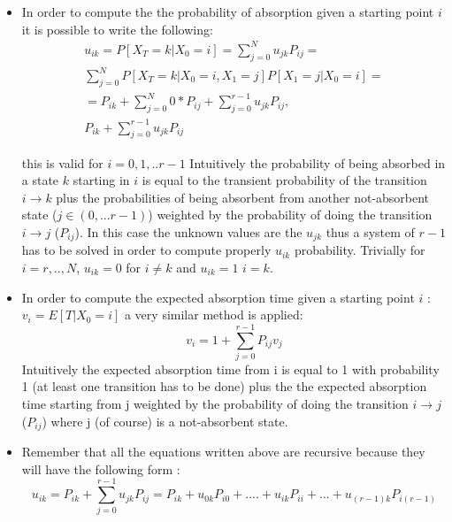 \begin{itemize}
\begin{itemize}
     \end{itemize} 
    \item In order to compute the the probability of absorption given a starting point $i$ it is possible to write the following:
    \begin{equation} 
    \begin{split}
      u_{ik} = P[X_T=k|X_0=i]= \sum\limits_{j=0}^N u_{jk}P_{ij}=\\
      \sum\limits_{j=0}^N P[X_T=k|X_0=i,X_1=j]P[X_1=j|X_0=i]=\\
      = P_{ik}+\sum\limits_{j=0}^N 0*P_{ij} +\sum\limits_{j=0}^{r-1} u_{jk}P_{ij},
      \\
      P_{ik}+\sum\limits_{j=0}^{r-1} u_{jk}P_{ij}              
      \end{split}      
     \end{equation}
     
       this is valid for $i= 0,1,..r-1$
    Intuitively the probability of being absorbed in a state $k$ starting in $i$ is equal to the transient probability of the transition $i\rightarrow k$ plus the probabilities of being absorbent from another not-absorbent state ($j \in (0,...r-1)$) weighted by the probability of doing the transition  $i\rightarrow j$ ($P_{ij}$). 
    In this case the unknown values are the $u_{jk}$ thus 
    a system of $ r-1$ has to be solved in order to compute properly $u_{ik}$ probability.
     \newline Trivially for $i= r,.. , N$, $u_{ik}=0$ for $i\neq k$ and $u_{ik}=1$ $i=k$.
 
 \item In order to compute the expected absorption time given a starting point $i$ : $v_i= E[T|X_0=i]$ a very similar method is applied: 
 \begin{equation}
 v_i= 1 + \sum\limits_{j=0}^{r-1} P_{ij} v_j
  \end{equation}
   Intuitively the expected absorption time from i is equal to 1 with probability 1 (at least one transition has to be done) plus the  the expected absorption time starting from j weighted by the probability of doing the transition  $i\rightarrow j$ ($P_{ij}$) where j (of course) is a not-absorbent state.
   
  \item Remember that all the equations written above are recursive because they will have the following form :
  \begin{equation}
     u_{ik}= P_{ik}+\sum\limits_{j=0}^{r-1} u_{jk}P_{ij} =  P_{ik}+ u_{0k}P_{i0} + .... + u_{ik}P_{ii} + ... +  u_{(r-1)k}P_{i(r-1)}
   \end{equation}  
\end{itemize}

